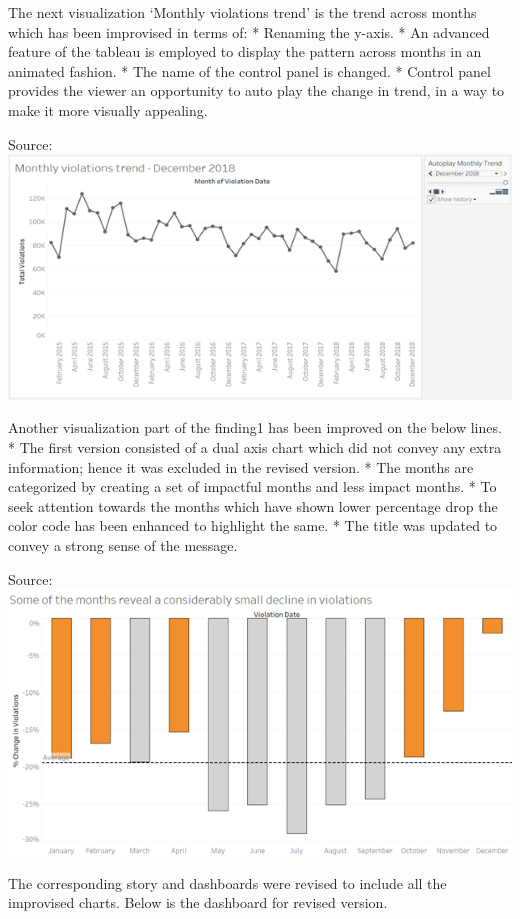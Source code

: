 \documentclass[]{book}
\begin{document}
The next visualization `Monthly violations trend' is the trend across months which has been improvised in terms of:
* Renaming the y-axis.
* An advanced feature of the tableau is employed to display the pattern across months in an animated fashion.
* The name of the control panel is changed.
* Control panel provides the viewer an opportunity to auto play the change in trend, in a way to make it more visually appealing.

Source:\citep{revised}
\includegraphics{images/Rev_img2.png}

Another visualization part of the finding1 has been improved on the below lines.
* The first version consisted of a dual axis chart which did not convey any extra information; hence it was excluded in the revised version.
* The months are categorized by creating a set of impactful months and less impact months.
* To seek attention towards the months which have shown lower percentage drop the color code has been enhanced to highlight the same.
* The title was updated to convey a strong sense of the message.

Source:\citep{revised}
\includegraphics{images/Rev_img3.png}

The corresponding story and dashboards were revised to include all the improvised charts. Below is the dashboard for revised version.
\end{document}
